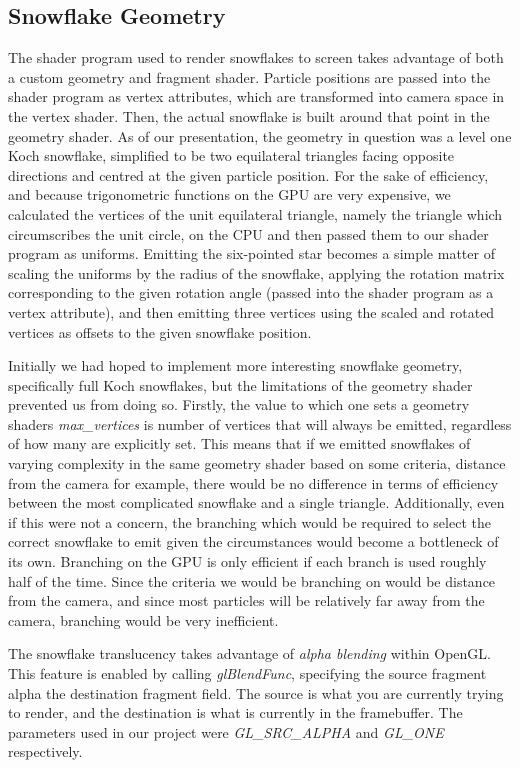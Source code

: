 \documentclass[conference]{acmsiggraph}
\begin{document}
\subsection{Snowflake Geometry}
The shader program used to render snowflakes to screen takes advantage of both a custom geometry and fragment shader. Particle positions are passed into the shader program as vertex attributes, which are transformed into camera space in the vertex shader. Then, the actual snowflake is built around that point in the geometry shader. As of our presentation, the geometry in question was a level one Koch snowflake, simplified to be two equilateral triangles facing opposite directions and centred at the given particle position. For the sake of efficiency, and because trigonometric functions on the GPU are very expensive, we calculated the vertices of the unit equilateral triangle, namely the triangle which circumscribes the unit circle, on the CPU and then passed them to our shader program as uniforms. Emitting the six-pointed star becomes a simple matter of scaling the uniforms by the radius of the snowflake, applying the rotation matrix corresponding to the given rotation angle (passed into the shader program as a vertex attribute), and then emitting three vertices using the scaled and rotated vertices as offsets to the given snowflake position.

Initially we had hoped to implement more interesting snowflake geometry, specifically full Koch snowflakes, but the limitations of the geometry shader prevented us from doing so. Firstly, the value to which one sets a geometry shaders \textit{max\_vertices} is number of vertices that will always be emitted, regardless of how many are explicitly set. This means that if we emitted snowflakes of varying complexity in the same geometry shader based on some criteria, distance from the camera for example, there would be no difference in terms of efficiency between the most complicated snowflake and a single triangle. Additionally, even if this were not a concern, the branching which would be required to select the correct snowflake to emit given the circumstances would become a bottleneck of its own. Branching on the GPU is only efficient if each branch is used roughly half of the time. Since the criteria we would be branching on would be distance from the camera, and since most particles will be relatively far away from the camera, branching would be very inefficient.

The snowflake translucency takes advantage of \textit{alpha blending} within OpenGL. This feature is enabled by calling \textit{glBlendFunc}, specifying the source fragment alpha the destination fragment field. The source is what you are currently trying to render, and the destination is what is currently in the framebuffer. The parameters used in our project were \textit{GL\_SRC\_ALPHA}  and \textit{GL\_ONE} respectively.
\end{document}
